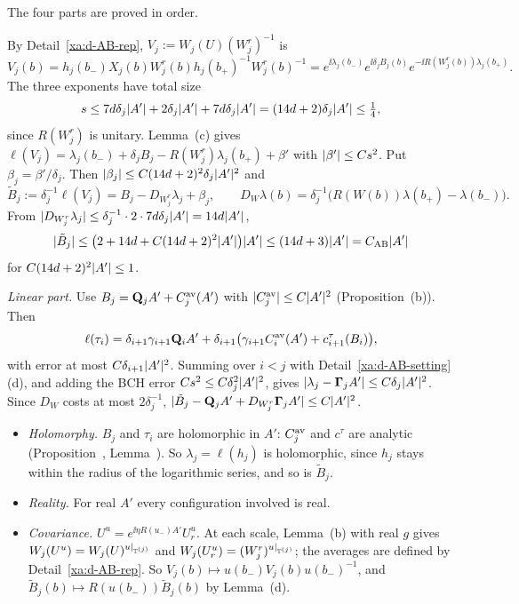 \begin{detail}\label{xa:d-AB-bounds}
The four parts are proved in order.
\begin{step}
By Detail~\ref{xa:d-AB-rep}, $V_j:=W_j(U)(W^r_j)^{-1}$ is
\[
V_j(b)=h_j(b_-)X_j(b)W^r_j(b)h_j(b_+)^{-1}W^r_j(b)^{-1}=e^{\ii\lambda_j(b_-)}e^{\ii\delta_jB_j(b)}e^{-\ii R(W^r_j(b))\lambda_j(b_+)} .
\]
The three exponents have total size
\[
s\le7d\delta_j\lvert A'\rvert+2\delta_j\lvert A'\rvert+7d\delta_j\lvert A'\rvert=(14d+2)\delta_j\lvert A'\rvert\le\tfrac14,
\]
since $R(W^r_j)$ is unitary. Lemma~(c) gives $\ell(V_j)=\lambda_j(b_-)+\delta_jB_j-R(W^r_j)\lambda_j(b_+)+\beta'$ with $\lvert\beta'\rvert\le Cs^2$. Put $\beta_j=\beta'/\delta_j$. Then $\lvert\beta_j\rvert\le C(14d+2)^2\delta_j\lvert A'\rvert^2$ and
\[
\tilde B_j:=\delta_j^{-1}\ell(V_j)=B_j-D_{W^r_j}\lambda_j+\beta_j,\qquad D_W\lambda(b)=\delta_j^{-1}\big(R(W(b))\lambda(b_+)-\lambda(b_-)\big).
\]
From $\lvert D_{W^r_j}\lambda_j\rvert\le\delta_j^{-1}\cdot2\cdot7d\delta_j\lvert A'\rvert=14d\lvert A'\rvert$,
\[
\lvert\tilde B_j\rvert\le\big(2+14d+C(14d+2)^2\lvert A'\rvert\big)\lvert A'\rvert\le(14d+3)\lvert A'\rvert=C_{\rm AB}\lvert A'\rvert
\]
for $C(14d+2)^2\lvert A'\rvert\le1$.

\emph{Linear part.} Use $B_j=\mathbf Q_jA'+C^{\rm av}_j(A')$ with $\lvert C^{\rm av}_j\rvert\le C\lvert A'\rvert^2$ (Proposition~(b)). Then
\[
\ell(\tau_i)=\delta_{i+1}\gamma_{i+1}\mathbf Q_iA'+\delta_{i+1}\big(\gamma_{i+1}C^{\rm av}_i(A')+c^\tau_{i+1}(B_i)\big),
\]
with error at most $C\delta_{i+1}\lvert A'\rvert^2$. Summing over $i<j$ with Detail~\ref{xa:d-AB-setting}(d), and adding the BCH error $Cs^2\le C\delta_j^2\lvert A'\rvert^2$, gives $\lvert\lambda_j-\boldsymbol\Gamma_jA'\rvert\le C\delta_j\lvert A'\rvert^2$. Since $D_W$ costs at most $2\delta_j^{-1}$, $\lvert\tilde B_j-\mathbf Q_jA'+D_{W^r_j}\boldsymbol\Gamma_jA'\rvert\le C\lvert A'\rvert^2$.
\end{step}

\begin{step}
\begin{itemize}
\item \emph{Holomorphy.} $B_j$ and $\tau_i$ are holomorphic in $A'$: $C^{\rm av}_j$ and $c^\tau$ are analytic (Proposition~, Lemma~). So $\lambda_j=\ell(h_j)$ is holomorphic, since $h_j$ stays within the radius of the logarithmic series, and so is $\tilde B_j$.
\item \emph{Reality.} For real $A'$ every configuration involved is real.
\item \emph{Covariance.} $U^u=e^{\ii\eta R(u_-)A'}U_r^u$. At each scale, Lemma~(b) with real $g$ gives $W_j(U^u)=W_j(U)^{u|_{\mathbb T^{(j)}}}$ and $W_j(U_r^u)=(W^r_j)^{u|_{\mathbb T^{(j)}}}$; the averages are defined by Detail~\ref{xa:d-AB-rep}. So $V_j(b)\mapsto u(b_-)V_j(b)u(b_-)^{-1}$, and $\tilde B_j(b)\mapsto R(u(b_-))\tilde B_j(b)$ by Lemma~(d).
\end{itemize}
\end{step}


\end{detail}
